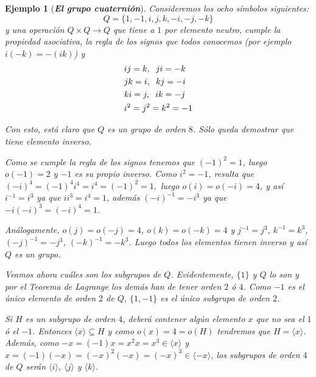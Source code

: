 \documentclass[12pt]{article}
\newtheorem{example}{Ejemplo}[theorem]
\begin{document}
\begin{example}[\textbf{\textit{El grupo cuaternión}}]

Consideremos los ocho símbolos siguientes: $$ Q = \lbrace 1,-1, i, j, k, -i,-j,-k \rbrace$$ y una operación $Q \times Q \longrightarrow Q$ que tiene a $1$ por elemento neutro, cumple la propiedad asociativa, la regla de los signos que todos conocemos (por ejemplo $i(-k) = -(ik)$) y \begin{equation*}
\begin{aligned}
&ij = k, \hspace{0.2cm} ji = -k\\
&jk = i, \hspace{0.2cm} kj = -i\\
&ki = j, \hspace{0.2cm} ik = -j\\
&i^{2} = j^{2} = k^{2} = -1
\end{aligned}
\end{equation*}

Con esto, está claro que $Q$ es un grupo de orden $8$. Sólo queda demostrar que tiene elemento inverso. 

Como se cumple la regla de los signos tenemos que $(-1)^{2} = 1$, luego $o(-1) =2$ y $-1$ es su propio inverso. Como $i^{2} = -1$, resulta que $(-i)^{4} = (-1)^{4}i^{4} = i^{4} = (-1)^{2} = 1,$ luego $o(i) = o(-i) = 4$, y así $i^{-1} = i^{3}$ ya que $ii^{3} = i^{4} = 1$, además $(-i)^{-1} = -i^{3}$ ya que $-i(-i)^{3} = (-i)^{4} = 1$. 

Análogamente, $o(j) = o(-j) = 4$, $o(k) = o(-k) = 4$ y $j^{-1} = j^{3}$, $k^{-1} = k^{3}$, $(-j)^{-1} = -j^{3}$, $(-k)^{-1} = -k^{3}$. Luego todos los elementos tienen inverso y así $Q$ es un grupo.


Veamos ahora cuáles son los subgrupos de $Q$. Evidentemente, $\lbrace 1 \rbrace$ y $Q$ lo son y por el \textit{Teorema de Lagrange} los demás han de tener orden $2$ ó $4$. Como $-1$ es el único elemento de orden $2$ de $Q$, $\lbrace 1, -1 \rbrace$ es el único subgrupo de orden $2$. 

Si $H$ es un subgrupo de orden $4$, deberá contener algún elemento $x$ que no sea el $1$ ó el $-1$. Entonces $\langle x \rangle \subseteq H$ y como $o(x) = 4=o(H)$ tendremos que $H = \langle x \rangle$. Además, como $-x = (-1)x = x^{2}x = x^{3} \in \langle x \rangle$ y $x  = (-1)(-x) = (-x)^{2}(-x) = (-x)^{3} \in \langle -x \rangle$, los subgrupos de orden $4$ de $Q$ serán $\langle i \rangle$, $\langle j \rangle$ y $\langle k \rangle$.



\end{example}
\end{document}
